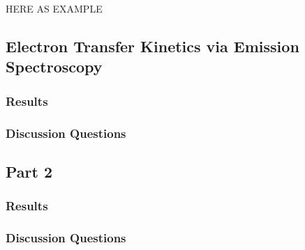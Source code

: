 
HERE AS EXAMPLE


\subsection{Electron Transfer Kinetics via Emission Spectroscopy}
\subsubsection*{Results}

\subsubsection*{Discussion Questions}

\subsection{Part 2}
\subsubsection*{Results}

\subsubsection*{Discussion Questions}







